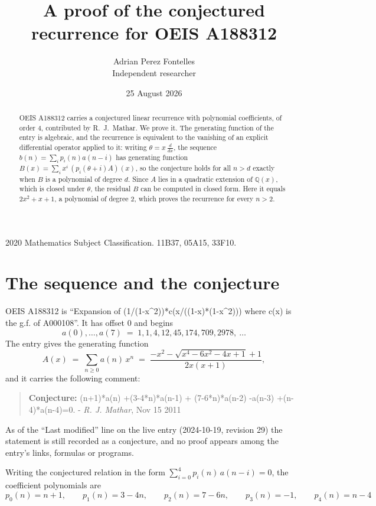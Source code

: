 \documentclass[11pt,a4paper]{article}
\title{A proof of the conjectured recurrence for OEIS A188312}
\author{Adrian Perez Fontelles\\ \small Independent researcher}
\date{25 August 2026}
\theoremstyle{plain}
\theoremstyle{definition}
\begin{document}
\maketitle

\begin{abstract}
OEIS A188312 carries a conjectured linear recurrence with polynomial coefficients, of
order 4, contributed by R.~J.~Mathar. We prove it. The generating function of the
entry is algebraic, and the recurrence is equivalent to the vanishing of an explicit
differential operator applied to it: writing $\theta=x\,\frac{d}{dx}$, the sequence
$b(n)=\sum_{i}p_{i}(n)a(n-i)$ has generating function
$B(x)=\sum_{i}x^{i}\,(p_{i}(\theta+i)A)(x)$, so the conjecture holds for all $n>d$ exactly
when $B$ is a polynomial of degree $d$. Since $A$ lies in a quadratic extension of
$\mathbb{Q}(x)$, which is closed under $\theta$, the residual $B$ can be computed in
closed form. Here it equals $2 x^{2} + x + 1$, a polynomial of degree $2$, which proves
the recurrence for every $n>2$.
\end{abstract}

\noindent\small 2020 Mathematics Subject Classification. 11B37, 05A15, 33F10.\normalsize

\section{The sequence and the conjecture}

OEIS A188312 is ``Expansion of (1/(1-x\^{}2))*c(x/((1-x)*(1-x\^{}2))) where c(x) is the g.f. of A000108''. It has offset $0$ and begins
\[
a(0),\dots,a(7)\;=\;1, 1, 4, 12, 45, 174, 709, 2978,\ \dots
\]
The entry gives the generating function
\begin{equation}\label{eq:gf}
A(x)\;=\;\sum_{n\ge 0} a(n)\,x^{n}\;=\;\frac{- x^{2} - \sqrt{x^{4} - 6 x^{2} - 4 x + 1} + 1}{2 x \left(x + 1\right)} ,
\end{equation}
and it carries the following comment:
\begin{quote}\small
\textbf{Conjecture:} (n+1)*a(n) +(3-4*n)*a(n-1) + (7-6*n)*a(n-2) -a(n-3) +(n-4)*a(n-4)=0. - \emph{R. J. Mathar}, Nov 15 2011
\end{quote}
As of the ``Last modified'' line on the live entry (2024-10-19, revision 29) the
statement is still recorded as a conjecture, and no proof appears among the entry's links,
formulas or programs.

Writing the conjectured relation in the form $\sum_{i=0}^{4}p_{i}(n)\,a(n-i)=0$,
the coefficient polynomials are
\[
p_{0}(n)=n + 1,\qquad p_{1}(n)=3 - 4 n,\qquad p_{2}(n)=7 - 6 n,\qquad p_{3}(n)=-1,\qquad p_{4}(n)=n - 4
\]
\end{document}
